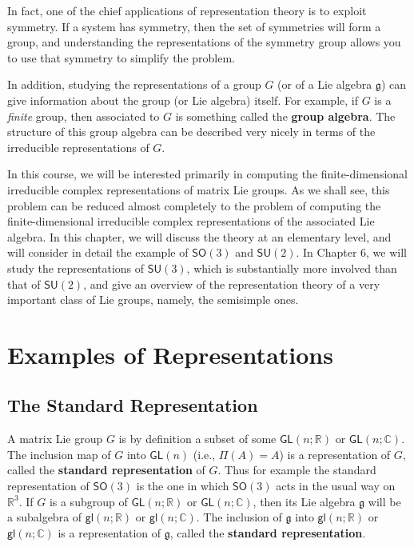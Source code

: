 \documentclass[12pt]{amsbook}
\let \frak = \mathfrak
\theoremstyle{plain}
\numberwithin{equation}{chapter}
\numberwithin{theorem}{chapter}
\begin{document}
In fact, one of the chief applications of representation theory is to exploit
symmetry. If a system has symmetry, then the set of symmetries will form a
group, and understanding the representations of the symmetry group allows you
to use that symmetry to simplify the problem.

In addition, studying the representations of a group $G$ (or of a Lie algebra
$\frak{g}$) can give information about the group (or Lie algebra) itself. For
example, if $G$ is a \textit{finite} group, then associated to $G $ is
something called the \textbf{group algebra}. The structure of this group
algebra can be described very nicely in terms of the irreducible
representations of $G$.

In this course, we will be interested primarily in computing the
finite-dimensional irreducible complex representations of matrix Lie groups.
As we shall see, this problem can be reduced almost completely to the problem
of computing the finite-dimensional irreducible complex representations of the
associated Lie algebra. In this chapter, we will discuss the theory at an
elementary level, and will consider in detail the example of $\mathsf{SO}(3)$
and $\mathsf{SU}(2)$. In Chapter 6, we will study the representations of
$\mathsf{SU}(3)$, which is substantially more involved than that of
$\mathsf{SU}(2)$, and give an overview of the representation theory of a very
important class of Lie groups, namely, the semisimple ones.

\section{Examples of Representations\label{examples.rep}}

\subsection{The Standard Representation}

A matrix Lie group $G$ is by definition a subset of some $\mathsf{GL}%
(n;\mathbb{R})$ or $\mathsf{GL}(n;\mathbb{C})$. The inclusion map of $G$ into
$\mathsf{GL}(n)$ (i.e., $\Pi(A)=A$) is a representation of $G$, called the
\textbf{standard representation} of $G$. Thus for example the standard
representation of $\mathsf{SO}(3)$ is the one in which $\mathsf{SO}(3)$ acts
in the usual way on $\mathbb{R}^{3}$. If $G$ is a subgroup of $\mathsf{GL}%
(n;\mathbb{R})$ or $\mathsf{GL}(n;\mathbb{C})$, then its Lie algebra
$\frak{g}$ will be a subalgebra of $\mathsf{gl}(n;\mathbb{R})$ or
$\mathsf{gl}(n;\mathbb{C})$. The inclusion of $\frak{g}$ into $\mathsf{gl}%
(n;\mathbb{R})$ or $\mathsf{gl}(n;\mathbb{C})$ is a representation of
$\frak{g}$, called the \textbf{standard representation}.
\end{document}
